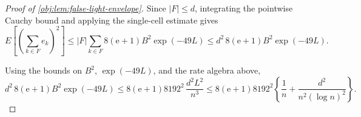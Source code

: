 \begin{proof}[Proof of \cref{obj:lem:false-light-envelope}]
Since \(|F|\le d\), integrating the pointwise Cauchy bound and applying the single-cell estimate gives
\[
E\!\left[
\left(\sum_{k\in F}e_k\right)^2
\right]
\le
|F|\sum_{k\in F}8(\mathrm e+1)B^2\exp(-49L)
\le
d^2\,8(\mathrm e+1)B^2\exp(-49L).
\]

Using the bounds on \(B^2\), \(\exp(-49L)\), and the rate algebra above,
\[
d^2\,8(\mathrm e+1)B^2\exp(-49L)
\le
8(\mathrm e+1)8192^2\,\frac{d^2L^2}{n^3}
\le
8(\mathrm e+1)8192^2
\left\{
\frac1n+\frac{d^2}{n^2(\log n)^2}
\right\}.
\]
\end{proof}
